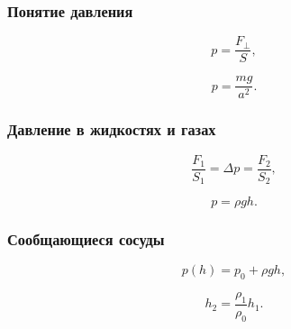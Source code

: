 \documentclass[12pt, a4paper]{article}
\begin{document}
\subsubsection*{Понятие давления}

\[
p = \frac{F_\perp}{S},
\]

\[
p = \frac{mg}{a^2}.
\]

\subsubsection*{Давление в жидкостях и газах}

\[
\frac{F_1}{S_1} = \Delta p = \frac{F_2}{S_2},
\]

\[
p = \rho g h.
\]

\subsubsection*{Сообщающиеся сосуды}

\[
p(h) = p_0 + \rho g h,
\]

\[
h_2 = \frac{\rho_1}{\rho_0} h_1.
\]
\end{document}
